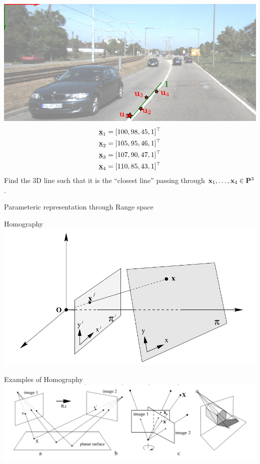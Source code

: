 \documentclass[times,t]{beamer}
\begin{document}
\begin{frame}
  \includegraphics[width=\linewidth]{media/lane-from-points.pdf}
  \begin{align*}
    \underline{\mathbf{x}}_1 &= [100, 98, 45,1]^\top\\
    \underline{\mathbf{x}}_2 &= [105, 95, 46, 1]^\top\\
    \underline{\mathbf{x}}_3 &= [107, 90, 47,1]^\top\\
    \underline{\mathbf{x}}_4 &= [110, 85, 43,1]^\top
  \end{align*}
  Find  the 3D line such that it is the ``closest line'' passing through
  $\mathbf{x}_1, \dots, \mathbf{x}_4 \in \mathbf{P}^3$.
\end{frame}

\begin{frame}{Parameteric representation through Range space}
  
\end{frame}


\begin{frame}{Homography}
  \includegraphics[width=\linewidth]{media/homography-maps-a-line-to-a-line.png}
\end{frame}

\begin{frame}{Examples  of  Homography}
  \includegraphics[width=\linewidth]{media/examples-of-homography.png}
\end{frame}
\end{document}
